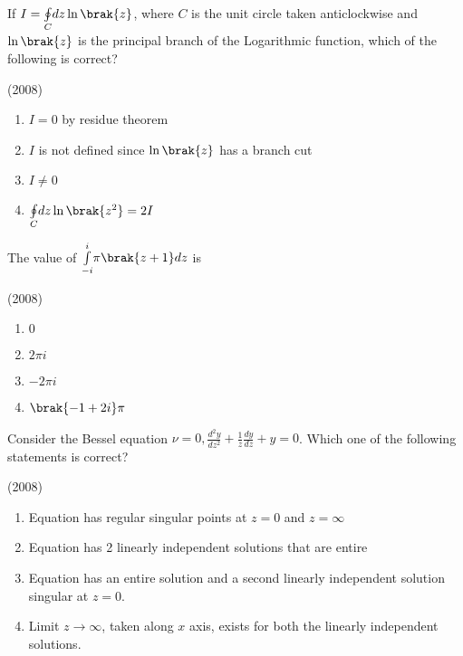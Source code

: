    \item If $I=\underset{C}{\oint}dz\ln\brak{z}$, where $C$ is the unit circle taken anticlockwise and $\ln\brak{z}$ is the principal branch of the Logarithmic function, which of the following is correct?
    
    \hfill{(2008)}

    \begin{multicols}{2}
        \begin{enumerate}
            \item $I=0$ by residue theorem
            \item $I$ is not defined since $\ln\brak{z}$ has a branch cut
            \item $I\neq0$
            \item $\underset{C}{\oint}dz\ln\brak{z^2}=2I$
        \end{enumerate}
    \end{multicols}

    \item The value of $\underset{-i}{\overset{i}{\int}}\pi\brak{z+1}dz$ is 
    
    \hfill{(2008)}

        \begin{multicols}{4}
            \begin{enumerate}
                \item $0$
                \item $2\pi i$
                \item $-2\pi i$
                \item $\brak{-1+2i}\pi$
            \end{enumerate}
        \end{multicols}
		
    \item Consider the Bessel equation $\nu=0,\frac{d^2y}{dz^2}+\frac{1}{z}\frac{dy}{dz}+y=0$. Which one of the following statements is correct?
    
    \hfill{(2008)}


            \begin{enumerate}
                \item Equation has regular singular points at $z=0$ and $z=\infty$
                \item Equation has 2 linearly independent solutions that are entire
                \item Equation has an entire solution and a second linearly independent solution singular at $z=0$.
                \item Limit $z\rightarrow\infty$, taken along $x$ axis, exists for both the linearly independent solutions.
            \end{enumerate}


